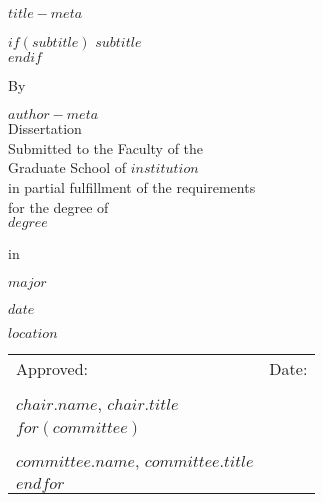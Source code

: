 \thispagestyle{empty}
\begin{center}
\doublespacing
$title-meta$

$if(subtitle)$
$subtitle$\\
$endif$

By

$author-meta$\\[2em]

Dissertation\\
Submitted to the Faculty of the\\
Graduate School of $institution$\\
in partial fulfillment of the requirements\\
for the degree of\\

\uppercase{$degree$}

in

$major$

$date$

$location$\\
\end{center}

\vfill
\begin{center}
\begin{tabular*}{\textwidth}{@{}p{}p{}@{}}
    Approved: & Date: \\[3em]
\hrulefill & \hrulefill\\
$chair.name$, $chair.title$ & \\
$for(committee)$
 &\\[1.5em]
\hrulefill & \hrulefill\\
$committee.name$, $committee.title$\\
$endfor$
\end{tabular*}
\end{center}
